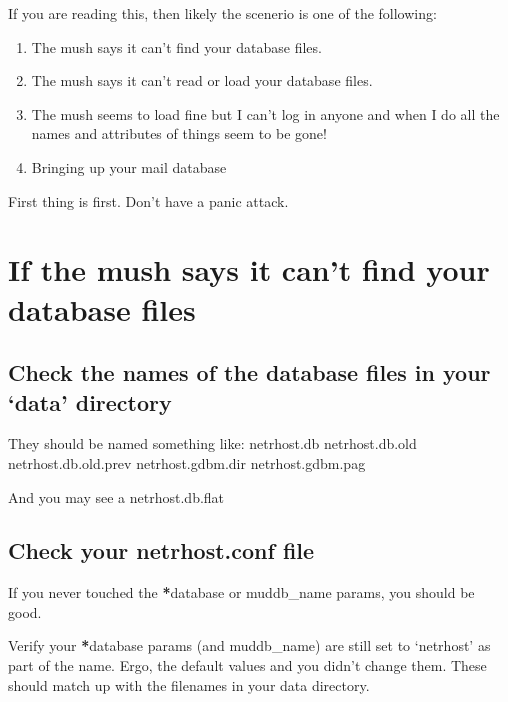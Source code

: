 \documentclass[letterpaper,10pt,english]{sphinxmanual}
\begin{document}
\sphinxAtStartPar
If you are reading this, then likely the scenerio is one of the following:
\begin{enumerate}
%
\item {} 
\sphinxAtStartPar
The mush says it can’t find your database files.

\item {} 
\sphinxAtStartPar
The mush says it can’t read or load your database files.

\item {} 
\sphinxAtStartPar
The mush seems to load fine but I can’t log in anyone and when I do
all the names and attributes of things seem to be gone!

\item {} 
\sphinxAtStartPar
Bringing up your mail database

\end{enumerate}

\sphinxAtStartPar
First thing is first.  Don’t have a panic attack.


\section{If the mush says it can’t find your database files}
\label{\detokenize{27-dbcorrupt:if-the-mush-says-it-can-t-find-your-database-files}}

\subsection{Check the names of the database files in your ‘data’ directory}
\label{\detokenize{27-dbcorrupt:check-the-names-of-the-database-files-in-your-data-directory}}
\sphinxAtStartPar
They should be named something like:
netrhost.db
netrhost.db.old
netrhost.db.old.prev
netrhost.gdbm.dir
netrhost.gdbm.pag

\sphinxAtStartPar
And you may see a netrhost.db.flat


\subsection{Check your netrhost.conf file}
\label{\detokenize{27-dbcorrupt:check-your-netrhost-conf-file}}
\sphinxAtStartPar
If you never touched the {\color{red}\bfseries{}*}database or muddb\_name params, you should be good.

\sphinxAtStartPar
Verify your {\color{red}\bfseries{}*}database params (and muddb\_name) are still set to ‘netrhost’ as
part of the name.  Ergo, the default values and you didn’t change them.
These should match up with the filenames in your data directory.
\end{document}
